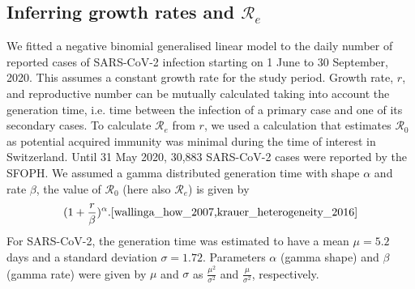 \documentclass[10pt, a4paper, twoside]{article}
\begin{document}
\begin{multicols}{2}
\subsection{Inferring growth rates and $\mathcal{R}_e$}\label{marker}
We fitted a negative binomial generalised linear model to the daily number of reported cases of SARS-CoV-2 infection starting on 1 June to 30 September, 2020. 
This assumes a constant growth rate for the study period.
Growth rate, $r$, and reproductive number can be mutually calculated taking into account the generation time, i.e. time between the infection of a primary case and one of its secondary cases.\cite{svensson_note_2007}
To calculate $\mathcal{R}_e$ from $r$, we used a calculation that estimates $\mathcal{R}_0$ as potential acquired immunity was minimal during the time of interest in Switzerland.
Until 31 May 2020, 30,883 SARS-CoV-2 cases were reported by the SFOPH.\cite{federal_office_of_public_health_coronavirus_nodate}
We assumed a gamma distributed generation time with shape $\alpha$ and rate $\beta$, the value of $\mathcal{R}_0$ (here also $\mathcal{R}_e$) is given by \[ (1 + \frac{r}{\beta} )^\alpha.\cite{wallinga_how_2007,krauer_heterogeneity_2016} \]
For SARS-CoV-2, the generation time was estimated to have a mean $\mu= 5.2$ days and a standard deviation $\sigma = 1.72$.\cite{ganyani_estimating_2020}
Parameters $\alpha$ (gamma shape) and $\beta$  (gamma rate) were given by $\mu$ and $\sigma$ as $\frac{\mu^2}{\sigma^2 }$ and $\frac{\mu}{\sigma^2}$, respectively.


\end{multicols}
\end{document}
